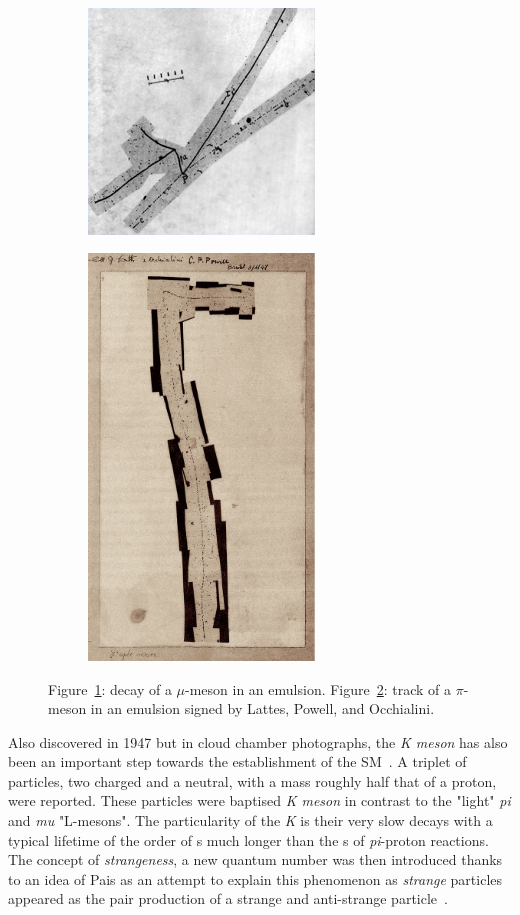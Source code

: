 	\begin{figure}[H]
		\begin{subfigure}{0.5\linewidth}
			\centering
			\includegraphics[width=6cm]{fig/chapt2/mu-meson.png}
			\caption{\label{fig:emulsions:A}}
		\end{subfigure}
		\begin{subfigure}{0.5\linewidth}
			\centering
			\includegraphics[width=6cm]{fig/chapt2/pion-emulsion.pdf}
			\caption{\label{fig:emulsions:B}}
		\end{subfigure}
		\caption{\label{fig:emulsions} Figure~\ref{fig:emulsions:A}: decay of a $\mu$-meson in an emulsion. Figure~\ref{fig:emulsions:B}: track of a $\pi$-meson in an emulsion signed by Lattes, Powell, and Occhialini.}
	\end{figure}
	
	Also discovered in 1947 but in cloud chamber photographs, the \textit{K meson} has also been an important step towards the establishment of the \acl{SM}~\cite{ROCHESTER1947}. A triplet of particles, two charged and a neutral, with a mass roughly half that of a proton, were reported. These particles were baptised \textit{K meson} in contrast to the "light" \textit{pi} and \textit{mu} "L-mesons". The particularity of the \textit{K} is their very slow decays with a typical lifetime of the order of \si{s} much longer than the \si{s} of \textit{pi}-proton reactions. The concept of \textit{strangeness}, a new quantum number was then introduced thanks to an idea of Pais as an attempt to explain this phenomenon as \textit{strange} particles appeared as the pair production of a strange and anti-strange particle~\cite{PAIS1952}.
	
